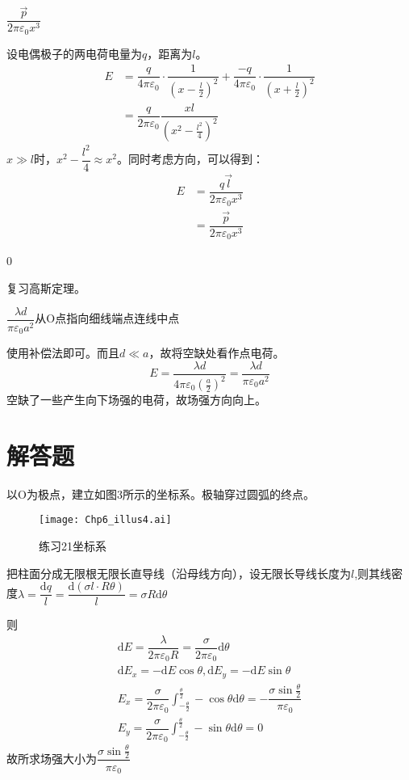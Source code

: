 \documentclass[b5paper,opensource]{./template/qyxf-book}
\newcommand{\di}[1]{\mathrm{d}#1}
\begin{document}
$\dfrac{\vec{p}}{2\pi\varepsilon_0x^3}$

\solve
设电偶极子的两电荷电量为$q$，距离为$l$。
\begin{align*}
	E&=\dfrac{q}{4\pi\varepsilon_0}\cdot \dfrac{1}{(x-\frac{l}{2})^2}+\dfrac{-q}{4\pi\varepsilon_0}\cdot \dfrac{1}{(x+\frac{l}{2})^2}\\
	&=\dfrac{q}{2\pi\varepsilon_0}\dfrac{xl}{{(x^2-\frac{l^2}{4})}^2}
\end{align*}
$x\gg l$时，$x^2-\dfrac{l^2}{4}\approx x^2$。同时考虑方向，可以得到：
\begin{align*}
	E&=\dfrac{q\vec{l}}{2\pi\varepsilon_0x^3}\\
	&=\dfrac{\vec{p}}{2\pi\varepsilon_0x^3}
\end{align*}

0

\solve
复习高斯定理。

$\dfrac{\lambda d}{\pi\varepsilon_0 a^2}$\quad 从O点指向细线端点连线中点

\solve
使用补偿法即可。而且$d\ll a$，故将空缺处看作点电荷。
\[
E=\dfrac{\lambda d}{4\pi\varepsilon_0{(\frac{a}{2})}^2}=\dfrac{\lambda d}{\pi\varepsilon_0 a^2}
\]
空缺了一些产生向下场强的电荷，故场强方向向上。

\section{解答题}


\solve
以O为极点，建立如图3所示的坐标系。极轴穿过圆弧的终点。
\begin{figure}[!h]
	\centering
	\texttt{[image: Chp6\_illus4.ai]}
	\caption{练习21\quad 坐标系}
\end{figure}
把柱面分成无限根无限长直导线（沿母线方向），设无限长导线长度为$l$,则其线密度$\lambda=\dfrac{\di{q}}{l}=\dfrac{\di{(\sigma l\cdot R\theta)}}{l}=\sigma R\di{\theta}$

则
\begin{gather*}
	\di{E}=\dfrac{\lambda}{2\pi\varepsilon_0R}=\dfrac{\sigma}{2\pi\varepsilon_0}\di{\theta}\\
	\di{E_x}=-\di{E}\cos\theta,\di{E_y}=-\di{E}\sin\theta\\
	E_x=\dfrac{\sigma}{2\pi\varepsilon_0}\int_{-\frac{\theta}{2}}^{\frac{\theta}{2}}-\cos\theta\di{\theta}=-\dfrac{\sigma\sin\frac{\theta}{2}}{\pi\varepsilon_0}\\
	E_y=\dfrac{\sigma}{2\pi\varepsilon_0}\int_{-\frac{\theta}{2}}^{\frac{\theta}{2}}-\sin\theta\di{\theta}=0
\end{gather*}
故所求场强大小为$\dfrac{\sigma\sin\frac{\theta}{2}}{\pi\varepsilon_0}$
\end{document}
